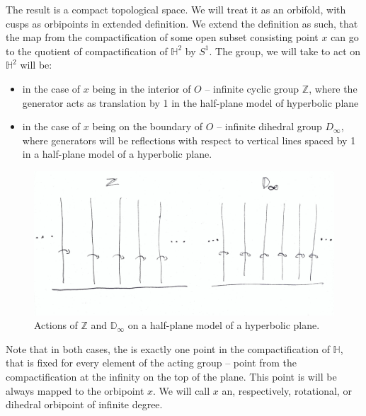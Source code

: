 The result is a compact topological space. We will treat it as an orbifold, with 
cusps as orbipoints in extended definition. 
We extend the definition as such, that the map from the compactification of 
some open subset consisting point $x$ can go to the quotient of compactification of 
$\mathbb{H}^2$ by $S^1$. The group, we will take to act on $\mathbb{H}^2$ will 
be:
\begin{itemize} 
\item in the case of $x$ being in the interior of $O$ -- infinite cyclic group $\mathbb{Z}$, 
where the generator acts as translation by 1 
in the half-plane model of hyperbolic plane   
\item in the case of $x$ being on the boundary of $O$ -- infinite dihedral group $D_\infty$, where 
generators will be reflections with respect to vertical lines spaced by 1 in a half-plane 
model of a hyperbolic plane.
\end{itemize}
\begin{figure}[H]
\centering
\includegraphics[width=\textwidth]{"../introduction/ZDinfty_2.1.jpg"}
\caption{Actions of $\mathbb{Z}$ and $\mathbb{D}_\infty$ on a half-plane model of a 
hyperbolic plane.}
\end{figure}
Note that in both cases, the is exactly one point in the compactification of $\mathbb{H}$, that is 
fixed for every element of the acting group -- point from the compactification at 
the infinity on the top of the plane. This point is will be always mapped to the orbipoint $x$. 
We will call $x$ an, respectively, rotational, or dihedral orbipoint of infinite degree.


